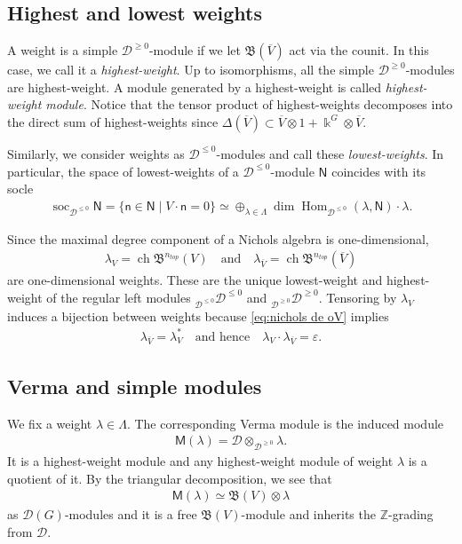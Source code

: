 \documentclass[reqno]{amsart}
\newcommand{\oV}{\overline{V}}
\renewcommand{\_}[1]{_{\left( #1 \right)}}
\renewcommand{\^}[1]{^{\left( #1 \right)}}
\newcommand{\ot}{{\otimes}}
\newcommand{\ku}{\Bbbk}
\newcommand\fM{\mathsf{M}}
\newcommand\fN{\mathsf{N}}
\newcommand\fn{\mathsf{n}}
\newcommand{\Z}{{\mathbb Z}}
\newcommand{\D}{\mathcal{D}}
\newcommand{\BV}{{\mathfrak B}}
\newcommand{\ch}{\operatorname{ch}}
\newcommand\Hom{\operatorname{Hom}}
\newcommand\soc{\operatorname{soc}_{\D^{\leq0}}}
\theoremstyle{plain}
\theoremstyle{definition}
\theoremstyle{remark}
\begin{document}


\subsection{Highest and lowest weights}\label{subsec:Highest and Lowest weight} 
A weight is a simple $\D^{\geq0}$-module if we let $\BV(\oV)$ act via the counit. In this case, we call it a {\it highest-weight}. Up to isomorphisms, all the simple $\D^{\geq0}$-modules are highest-weight. A module generated by a highest-weight is called {\it highest-weight module}. Notice that the tensor product of highest-weights decomposes into the direct sum of highest-weights since $\Delta(\oV)\subset\oV\ot1+\ku^{G}\ot\oV$.


Similarly, we consider weights as $\D^{\leq0}$-modules and call these {\it lowest-weights}. In particular, the space of lowest-weights of a $\D^{\leq0}$-module $\fN$ coincides with its socle
\begin{align}\label{eq:soc Dleq0}
\soc\fN=\{\fn\in\fN\mid V\cdot\fn=0\}\simeq\oplus_{\lambda\in\Lambda}\dim\Hom_{\D^{\leq0}}(\lambda,\fN)\cdot \lambda.
\end{align}

Since the maximal degree component of a Nichols algebra is one-dimensional,
\begin{align*}
\lambda_{V}=\ch\BV^{n_{top}}(V)\quad\mbox{and}\quad\lambda_{\oV}=\ch\BV^{n_{top}}(\oV)
\end{align*}
are one-dimensional weights. These are the unique lowest-weight and highest-weight  of the regular left modules ${}_{\D^{\leq0}}\D^{\leq0}$ and ${}_{\D^{\geq0}}\D^{\geq0}$.
Tensoring by $\lambda_V$ induces a bijection between weights because \eqref{eq:nichols de oV} implies
\begin{align*}
\lambda_{\oV}=\lambda_V^*\quad\mbox{and hence}\quad\lambda_V\cdot\lambda_{\oV}=\varepsilon.
\end{align*}

\subsection{Verma and simple modules} We fix a weight $\lambda\in\Lambda$. The corresponding Verma module \cite[Definition 12]{PV2} is the induced module
\begin{align}\label{eq:verma}
\fM(\lambda)=\D\ot_{\D^{\geq0}}\lambda. 
\end{align}
It is a highest-weight module and any highest-weight module of weight $\lambda$ is a quotient of it. By the triangular decomposition, we see that \begin{align*}
\fM(\lambda)\simeq\BV(V)\ot\lambda                                                                                                                                                   
\end{align*}
as $\D(G)$-modules and it is a free $\BV(V)$-module and inherits the $\Z$-grading from $\D$.
\end{document}
